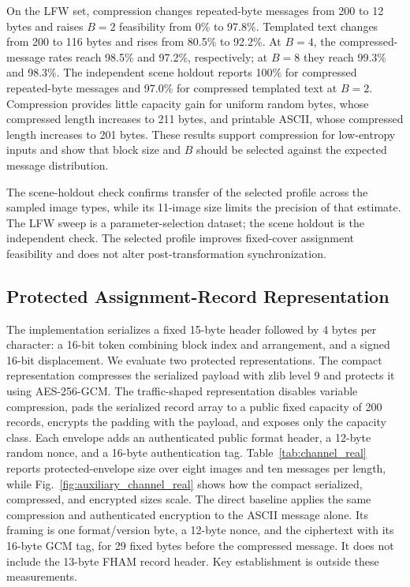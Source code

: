 \documentclass[preprint,12pt]{elsarticle}
\theoremstyle{plain}
\begin{document}
On the LFW set, compression changes repeated-byte messages from 200 to 12
bytes and raises $B=2$ feasibility from 0\% to 97.8\%. Templated text changes
from 200 to 116 bytes and rises from 80.5\% to 92.2\%. At $B=4$, the
compressed-message rates reach 98.5\% and 97.2\%, respectively; at $B=8$ they
reach 99.3\% and 98.3\%. The independent scene holdout reports 100\% for
compressed repeated-byte messages and 97.0\% for compressed templated text at
$B=2$. Compression provides little capacity gain for uniform random bytes,
whose compressed length increases to 211 bytes, and printable ASCII, whose
compressed length increases to 201 bytes. These results support compression
for low-entropy inputs and show that block size and $B$ should be selected
against the expected message distribution.

\begin{table}[!t]
\centering
\small
\caption{Lossless Preprocessing and Assignment Feasibility at 200 Source Bytes}
\label{tab:preprocessing_capacity}
\resizebox{\linewidth}{!}{}
\end{table}

The scene-holdout check confirms transfer of the selected profile across the
sampled image types, while its 11-image size limits the precision of that
estimate. The LFW sweep is a parameter-selection dataset; the scene holdout is
the independent check. The selected profile improves fixed-cover assignment
feasibility and does not alter post-transformation synchronization.

\subsection{Protected Assignment-Record Representation}

The implementation serializes a fixed 15-byte header followed by 4 bytes per
character: a 16-bit token combining block index and arrangement, and a signed
16-bit displacement. We evaluate two protected representations. The compact
representation compresses the serialized payload with zlib level 9 and
protects it using AES-256-GCM. The traffic-shaped representation disables
variable compression, pads the serialized record array to a public fixed
capacity of 200 records, encrypts the padding with the payload, and exposes
only the capacity class. Each envelope adds an authenticated public format
header, a 12-byte random nonce, and a 16-byte authentication tag.
Table~\ref{tab:channel_real} reports protected-envelope size over eight
images and ten messages per length, while Fig.~\ref{fig:auxiliary_channel_real}
shows how the compact serialized, compressed, and encrypted sizes scale. The
direct baseline applies the same compression and authenticated encryption to
the ASCII message alone. Its framing is one format/version byte, a 12-byte
nonce, and the ciphertext with its 16-byte GCM tag, for 29 fixed bytes before
the compressed message. It does not include the 13-byte FHAM record header.
Key establishment is outside these measurements.
\end{document}

